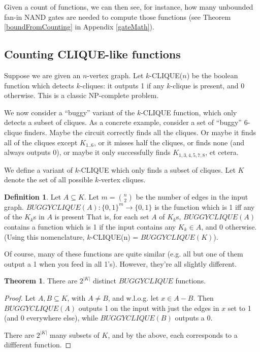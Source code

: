 \documentclass[12pt]{article}
\theoremstyle{definition}
\newtheorem{thm}{Theorem}[section]
\newtheorem{defn}{Definition}[section]
\begin{document}
Given a count of functions, we can then see, for instance,
how many unbounded fan-in NAND gates are needed to compute
those functions (see Theorem \ref{boundFromCounting}
in Appendix \ref{gateMath}).

\subsection{Counting CLIQUE-like functions}

Suppose we are given an $n$-vertex graph.
Let $k$-CLIQUE($n$) be the boolean function which
detects $k$-cliques: it outputs 1 if any $k$-clique
is present, and 0 otherwise. This is a classic
NP-complete problem.

We now consider a ``buggy'' variant of the $k$-CLIQUE function,
which only detects a subset of cliques.
As a concrete example,
consider a set of ``buggy'' 6-clique finders. 
Maybe the circuit correctly
finds all the cliques. Or maybe it finds all of the cliques except $K_{1..6}$,
or it misses half the cliques, or finds none (and always outputs 0), or maybe
it only successfully finds $K_{1,3,4,5,7,8}$, et cetera.

We define a variant of $k$-CLIQUE which only
finds a subset of cliques.
Let $K$ denote the set of all possible
$k$-vertex cliques.

\begin{defn}
\label{BUGGYCLIQUE}
Let $A \subseteq K$.
Let $m = {n \choose 2}$ be the number of edges in the input graph.
$BUGGYCLIQUE(A): \{0,1\}^m \rightarrow \{0,1\}$ is the function which
is 1 iff any of the $K_k$s in $A$ is present 
That is, for each set $A$ of $K_k$s, $BUGGYCLIQUE(A)$
contains a function which is 1 if the input contains any $K_k \in A$,
and 0 otherwise. (Using this nomenclature,
$k$-CLIQUE(n) = $BUGGYCLIQUE(K)$).
\end{defn}

Of course, many of these functions are quite similar (e.g. all but one of them
output a 1 when you feed in all 1's). However, they're all slightly different.

\begin{thm}
\label{buggyDistinct}
There are  $2^{|K|}$ distinct $BUGGYCLIQUE$ functions.
\end{thm}
\begin{proof}

Let $A,B \subseteq K$, with $A \neq B$, and w.l.o.g.
let $x \in A-B$. Then $BUGGYCLIQUE(A)$ outputs 1 on the input
with just the edges in $x$ set to 1 (and 0 everywhere else),
while $BUGGYCLIQUE(B)$ outputs a 0.

There are $2^{|K|}$ many subsets of $K$,
and by the above, each corresponds to a diffferent function.
\end{proof}
\end{document}
